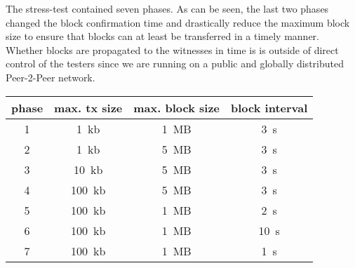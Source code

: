 The stress-test contained seven phases. As can be seen, the last two phases
changed the block confirmation time and drastically reduce the maximum block
size to ensure that blocks can at least be transferred in a timely manner.
Whether blocks are propagated to the witnesses in time is is outside of direct control of the testers
since we are running on a public and globally distributed Peer-2-Peer network.

\begin{tabular}{c|c|c|c}
 \textbf{phase} & \textbf{max. tx size} & \textbf{max. block size} & \textbf{block interval} \\\hline
 1 & \SI{1}{kb}   & \SI{1}{MB}  & \SI{3}{s} \\
 2 & \SI{1}{kb}   & \SI{5}{MB}  & \SI{3}{s} \\
 3 & \SI{10}{kb}  & \SI{5}{MB}  & \SI{3}{s} \\
 4 & \SI{100}{kb} & \SI{5}{MB}  & \SI{3}{s} \\
 5 & \SI{100}{kb} & \SI{1}{MB}  & \SI{2}{s} \\
 6 & \SI{100}{kb} & \SI{1}{MB}  & \SI{10}{s} \\
 7 & \SI{100}{kb} & \SI{1}{MB}  & \SI{1}{s} \\\hline
\end{tabular}

